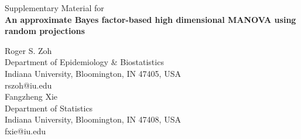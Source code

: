 \documentclass[]{article}
\begin{document}
\pagestyle{fancy}
\fancyhf{}
\rhead{\bfseries\thepage}

\baselineskip 20pt
\vspace{-0.5cm}
\begin{center}
{\LARGE{Supplementary Material for \\
 \bf{An approximate Bayes factor-based high dimensional MANOVA using random projections}}}
\end{center}


\setcounter{equation}{0}
\setcounter{page}{1}
\setcounter{table}{0}
\setcounter{figure}{0}
\setcounter{section}{0}

\renewcommand{\theequation}{S.\arabic{equation}}
\renewcommand{\thesubsection}{S.\arabic{section}.\arabic{subsection}}
\renewcommand{\thesection}{S.\arabic{section}}
\renewcommand{\thepage}{S.\arabic{page}}
\renewcommand{\thetable}{S.\arabic{table}}
\renewcommand{\thefigure}{S.\arabic{figure}}
\baselineskip=12pt
\baselineskip=15pt
\begin{center}
Roger S. Zoh\\
Department of Epidemiology \& Biostatistics\\
	   Indiana University, Bloomington, IN 47405, USA\\
rszoh@iu.edu\\
Fangzheng Xie\\
Department of Statistics\\
	   Indiana University, Bloomington, IN 47408, USA\\
fxie@iu.edu\\


\end{center}
\end{document}

